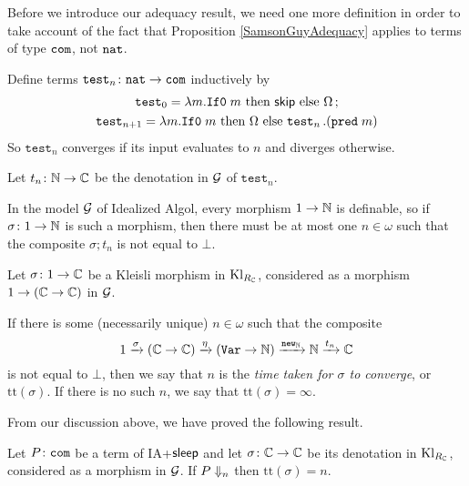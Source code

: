 \documentclass{article}
\begin{document}
Before we introduce our adequacy result, we need one more definition in order to take account of the fact that Proposition \ref{SamsonGuyAdequacy} applies to terms of type ${\mathtt{com}}$, not ${\mathtt{nat}}$.

\newcommand{\test}{{\mathtt{test}}}
\begin{definition}
  Define terms $\test_n\from\nat\to\com$ inductively by
  \begin{gather*}
    \test_0 = \lambda m.\IfO m\text{ then }\skipp\text{ else }\Omega\,; \\
    \test_{n+1} = \lambda m.\IfO m\text{ then }\Omega\text{ else }\test_n\,. (\pred m)
  \end{gather*}
  So $\test_n$ converges if its input evaluates to $n$ and diverges otherwise.
  
  Let $t_n\colon\mathbb{N} \to \mathbb{C}$ be the denotation in $\mathcal G$ of $\test_n$.
\end{definition}

\begin{remark}
  In the model $\mathcal G$ of Idealized Algol, every morphism $1 \to \mathbb{N}$ is definable, so if $\sigma\colon 1 \to \mathbb{N}$ is such a morphism, then there must be at most one $n\in\omega$ such that the composite $\sigma;t_n$ is not equal to $\bot$.
\end{remark}

\newcommand{\tit}{\mathrm{tt}}
\begin{definition}
  Let $\sigma\colon 1 \to \mathbb{C}$ be a Kleisli morphism in $\operatorname{Kl}_{R_{\mathbb{C}}}$, considered as a morphism $1 \to (\mathbb{C} \to \mathbb{C})$ in $\mathcal G$.  

  If there is some (necessarily unique) $n\in\omega$ such that the composite
  \[
    1 \xrightarrow{\sigma}
    (\mathbb{C} \to \mathbb{C}) \xrightarrow{\eta}
    ({\mathtt{Var}} \to \mathbb{N}) \xrightarrow{{\mathtt{new}}_{\mathbb{N}}}
    \mathbb{N} \xrightarrow{t_n}
    \mathbb{C}
    \]
  is not equal to $\bot$, then we say that $n$ is the \emph{time taken for $\sigma$ to converge}, or $\tit(\sigma)$.
  If there is no such $n$, we say that $\tit(\sigma)=\infty$.
  \label{DefTimeTaken}
\end{definition}

From our discussion above, we have proved the following result.

\begin{proposition}
  Let $P\colon {\mathtt{com}}$ be a term of IA+${\mathsf{sleep}}$ and let $\sigma\colon \mathbb{C} \to \mathbb{C}$ be its denotation in $\operatorname{Kl}_{R_{\mathbb{C}}}$, considered as a morphism in $\mathcal G$.
  If $P\Downarrow_n$ then $\tit(\sigma)=n$.
  \label{IaSleepSoundness}
\end{proposition}
\end{document}
